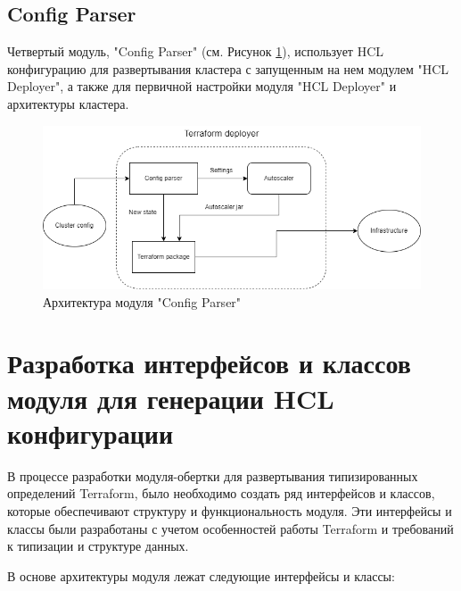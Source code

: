 \subsection{Config Parser}

Четвертый модуль, "Config Parser" (см. Рисунок \ref{fig:cp}), использует HCL
конфигурацию для развертывания кластера с запущенным на нем модулем "HCL
Deployer", а также для первичной настройки модуля "HCL Deployer" и архитектуры
кластера. 

\begin{figure}[h]
  \centering
  \includegraphics[scale=0.6]{img/4.png}
  \caption{Архитектура модуля "Config Parser"}
  \label{fig:cp}
\end{figure}

\section{Разработка интерфейсов и классов модуля для генерации HCL конфигурации}

В процессе разработки модуля-обертки для развертывания типизированных
определений Terraform, было необходимо создать ряд интерфейсов и классов,
которые обеспечивают структуру и функциональность модуля. Эти интерфейсы и
классы были разработаны с учетом особенностей работы Terraform и требований к
типизации и структуре данных.

В основе архитектуры модуля лежат следующие интерфейсы и классы:

